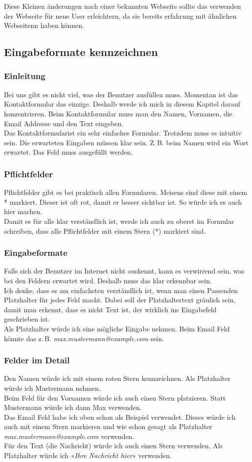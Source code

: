 \documentclass[10pt]{article}
\begin{document}
	Diese Kleinen änderungen nach einer bekannten Webseite sollte das verwenden der Webseite für neue User erleichtern, da sie bereits erfahrung mit ähnlichen Webseitenn haben können.
	
	
	\subsection{Eingabeformate kennzeichnen}
	\subsubsection{Einleitung}
	Bei uns gibt es nicht viel, was der Benutzer ausfüllen muss. Momentan ist das Kontaktformular das einzige. Deshalb werde ich mich in diesem Kapitel darauf konzentrieren. Beim Kontaktformular muss man den Namen, Vornamen, die Email Addresse und den Text eingeben.\\
	Das Kontaktformularist ein sehr einfaches Formular. Trotzdem muss es intuitiv sein. Die erwarteten Eingaben müssen klar sein. Z.\,B. beim Namen wird ein Wort erwartet. Das Feld muss ausgefüllt werden.
	\subsubsection{Pflichtfelder}
	Pflichtfelder gibt es bei praktisch allen Formularen. Meisens sind diese mit einem * markiert. Dieser ist oft rot, damit er besser sichtbar ist. So würde ich es auch hier machen.\\
	Damit es für alle klar verständlich ist, werde ich auch zu oberst im Formular schreiben, dass alle Pflichtfelder mit einem Stern (*) markiert sind.
	\subsubsection{Eingabeformate}
	Falls sich der Benutzer im Internet nicht auskennt, kann es verwirrend sein, was bei den Feldern erwartet wird. Deshalb muss das klar erkennbar sein.\\
	Ich denke, dass es am einfachsten verständlich ist, wenn man einen Passenden Platzhalter für jedes Feld macht. Dabei soll der Platzhaltertext gräulich sein, damit man erkennt, dass es nicht Text ist, der wirklich ins Eingabefeld geschrieben ist.\\
	Als Platzhalter würde ich eine mögliche Eingabe nehmen. Beim Email Feld könnte das z.\,B. \textit{max.mustermann@example.com} sein.
	\subsubsection{Felder im Detail}
	Den Namen würde ich mit einem roten Stern kennzeichnen. Als Platzhalter würde ich Mustermann nehmen.\\
	Beim Feld für den Vornamen würde ich auch einen Stern platzieren. Statt Mustermann würde ich dann Max verwenden.\\
	Das Email Feld habe ich oben schon als Beispiel verwendet. Dieses würde ich auch mit einem Stern markieren und wie schon gesagt als Platzhalter \textit{max.mustermann@example.com} verwenden.\\
	Für den Text (die Nachricht) würde ich auch einen Stern verwenden. Als Platzhalter würde ich «\textit{Ihre Nachricht hier}» verwenden.
	
\end{document}
